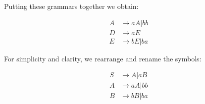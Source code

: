 \noindent Putting these grammars together we obtain:

\begin{align*}
    A &\rightarrow aA | bb \\
    D &\rightarrow aE \\
    E &\rightarrow bE | ba
\end{align*}

\noindent For simplicity and clarity, we rearrange and rename the symbols:

\begin{align*}
    S &\rightarrow A | aB \\
    A &\rightarrow aA | bb \\
    B &\rightarrow bB | ba
\end{align*}
